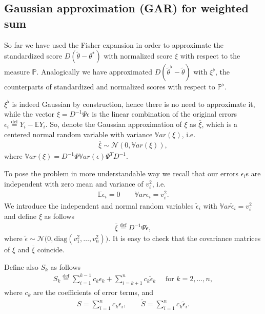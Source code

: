 \documentclass[12pt]{article}
\renewcommand{\=}[1]{\stackrel{#1}{=}} %
\providecommand{\e}{\epsilon}
\begin{document}
\subsection{Gaussian approximation (GAR) for weighted sum} 
So far we have used the Fisher expansion in order to approximate the standardized score $D(\tilde{\theta} - \theta^*)$ with normalized score $\xi$ with respect to the measure $\mathbb{P}$. Analogically we have approximated $D(\tilde{\theta}^{\flat} - \tilde{\theta})$ with $\xi^{\flat}$, the counterparts of standardized  and normalized scores with respect to $\mathbb{P}^{\flat}$.
\par $\xi^{\flat}$ is indeed Gaussian by construction, hence there is no need to approximate it, while the vector $\xi = D^{-1}\Psi \e$ is the linear combination of the original errors $\e_i \stackrel{\text{def}}{=} Y_i - \mathbb{E}Y_i$. So, denote the Gaussian approximation of $\xi$ as $\overline{\xi}$, which is a centered normal random variable with variance $\mathbb{V}ar(\xi)$, i.e.
\begin{align}
\overline{\xi} \sim \mathcal{N}(0, \mathbb{V}ar(\xi)),
\end{align}
where $\mathbb{V}ar(\xi) = D^{-1}\Psi \mathbb{V}ar(\e) \Psi^T D^{-1}$.
\par To pose the problem in more understandable way we recall that our errors $\e_i$s are independent with zero mean and variance of $v_i^2$, i.e. 
\begin{align}
\mathbb{E} \e_i = 0 \qquad \mathbb{V}ar \e_i = v_i^2.
\end{align}
We introduce the independent and normal random variables $\tilde{\e}_i$ with $\mathbb{V}ar \tilde{\e}_i = v_i^2$ and define $\overline{\xi}$ as follows 
\begin{align}
\overline{\xi} \stackrel{\text{def}}{=} D^{-1}\Psi \tilde{\e},
\end{align}  
where $\tilde{\e} \sim \mathcal{N}\big(0, \text{diag}(v_1^2, \dots, v_n^2)\big)$. It is easy to check that the covariance matrices of $\xi$ and $\overline{\xi}$ coincide.
\par Define also $S_k$ as follows
\begin{align}
S_k \stackrel{\text{def}}{=} \sum_{i=1}^{k-1} c_k \e_k + \sum_{i=k + 1}^{n} c_k \tilde{\e}_k \quad \text{ for } k = 2, \dots, n,
\end{align}
where $c_k$ are the coefficients of error terms, 
and 
\begin{align}
S = \sum_{i=1}^n c_k\e_i, \qquad \tilde{S} = \sum_{i=1}^n c_k \tilde{\e}_i.
\end{align}
\end{document}

